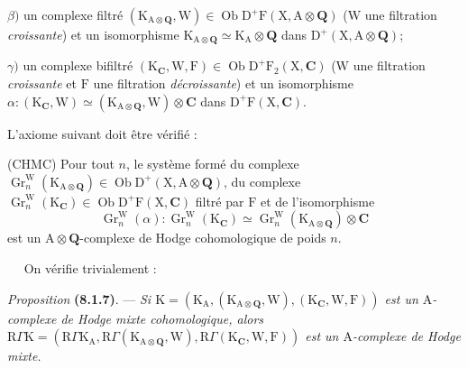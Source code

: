 \documentclass[11pt,leqno]{article}
\newcommand{\Page}[1]{\ifvmode\noindent\else\unskip\ \fi{\footnotesize\textcolor{gray}{[p.\,#1]}}\ \ignorespaces}
\begin{document}
\(\beta)\) un complexe filtré \((\mathrm{K}_{\mathrm{A}\otimes\mathbf{Q}},\mathrm{W})\in\operatorname{Ob}\mathrm{D}^{+}\mathrm{F}(\mathrm{X},\mathrm{A}\otimes\mathbf{Q})\) (\(\mathrm{W}\) une filtration \textit{croissante}) et un isomorphisme \(\mathrm{K}_{\mathrm{A}\otimes\mathbf{Q}}\simeq\mathrm{K}_{\mathrm{A}}\otimes\mathbf{Q}\) dans \(\mathrm{D}^{+}(\mathrm{X},\mathrm{A}\otimes\mathbf{Q})\);

\(\gamma)\) un complexe bifiltré \((\mathrm{K}_{\mathbf{C}},\mathrm{W},\mathrm{F})\in\operatorname{Ob}\mathrm{D}^{+}\mathrm{F}_{2}(\mathrm{X},\mathbf{C})\) (\(\mathrm{W}\) une filtration \textit{croissante} et \(\mathrm{F}\) une filtration \textit{décroissante}) et un isomorphisme \(\alpha:(\mathrm{K}_{\mathbf{C}},\mathrm{W})\simeq(\mathrm{K}_{\mathrm{A}\otimes\mathbf{Q}},\mathrm{W})\otimes\mathbf{C}\) dans \(\mathrm{D}^{+}\mathrm{F}(\mathrm{X},\mathbf{C})\).

L’axiome suivant doit être vérifié :

(CHMC) Pour tout \(n\), le système formé du complexe \(\operatorname{Gr}_{n}^{\mathrm{W}}(\mathrm{K}_{\mathrm{A}\otimes\mathbf{Q}})\in\operatorname{Ob}\mathrm{D}^{+}(\mathrm{X},\mathrm{A}\otimes\mathbf{Q})\), du complexe \(\operatorname{Gr}_{n}^{\mathrm{W}}(\mathrm{K}_{\mathbf{C}})\in\operatorname{Ob}\mathrm{D}^{+}\mathrm{F}(\mathrm{X},\mathbf{C})\) filtré par \(\mathrm{F}\) et de l’isomorphisme
\[
\operatorname{Gr}_{n}^{\mathrm{W}}(\alpha):
\operatorname{Gr}_{n}^{\mathrm{W}}(\mathrm{K}_{\mathbf{C}})
\simeq
\operatorname{Gr}_{n}^{\mathrm{W}}(\mathrm{K}_{\mathrm{A}\otimes\mathbf{Q}})\otimes\mathbf{C}
\]
est un \(\mathrm{A}\otimes\mathbf{Q}\)-complexe de Hodge cohomologique de poids \(n\).

\Page{30}
On vérifie trivialement :

\textit{Proposition} \textbf{(8.1.7)}. — \textit{Si \(\mathrm{K}=(\mathrm{K}_{\mathrm{A}},(\mathrm{K}_{\mathrm{A}\otimes\mathbf{Q}},\mathrm{W}),(\mathrm{K}_{\mathbf{C}},\mathrm{W},\mathrm{F}))\) est un \(\mathrm{A}\)-complexe de Hodge mixte cohomologique, alors \(\mathrm{R}\Gamma\mathrm{K}=(\mathrm{R}\Gamma\mathrm{K}_{\mathrm{A}},\mathrm{R}\Gamma(\mathrm{K}_{\mathrm{A}\otimes\mathbf{Q}},\mathrm{W}),\mathrm{R}\Gamma(\mathrm{K}_{\mathbf{C}},\mathrm{W},\mathrm{F}))\) est un \(\mathrm{A}\)-complexe de Hodge mixte.}
\end{document}
